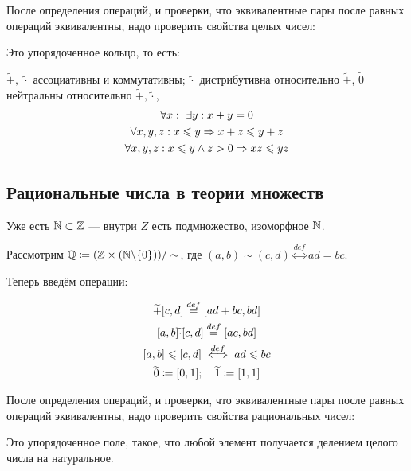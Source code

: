 \documentclass[a4paper]{report}
\begin{document}
    После определения операций, и проверки, что эквивалентные пары после равных операций эквивалентны, надо проверить свойства целых чисел:


    Это упорядоченное кольцо, то есть:

    $\tilde{+}, ~\tilde{\cdot}$ ассоциативны и коммутативны; $\tilde{\cdot}$ дистрибутивна относительно $\tilde{+}$, $\tilde{0}$ нейтральны относительно $\tilde{+}, \tilde{\cdot}$,
    \begin{gather*}
        \forall x:~ \exists y : x + y = 0\\
        \forall x, y, z : x \leqslant y \Rightarrow x + z \leqslant y + z\\
        \forall x, y, z : x \leqslant y \land z > 0 \Rightarrow xz \leqslant yz\\
    \end{gather*}

    \subsection{Рациональные числа в теории множеств}

    Уже есть $\mathbb{N} \subset \mathbb{Z}$ --- внутри $Z$ есть подмножество, изоморфное $\mathbb{N}$.

    Рассмотрим $\mathbb{Q} \coloneqq (\mathbb{Z} \times (\mathbb{N} \backslash \{0\}))/\sim$, где $(a, b) \sim (c, d) \overset{def}{\iff} ad = bc$.

    Теперь введём операции:

    \begin{gather*}
    [a, b]
        \tilde{+} [c, d] \bydef [ad + bc, bd]\\
        [a, b] \tilde{\cdot} [c, d] \bydef [ac, bd]\\
        [a, b] \le [c, d] \overset{def}{\iff} ad \le bc\\
        \tilde{0} \coloneqq [0, 1]; \quad \tilde{1} \coloneqq [1, 1]\\
    \end{gather*}

    После определения операций, и проверки, что эквивалентные пары после равных операций эквивалентны, надо проверить свойства рациональных чисел:

    Это упорядоченное поле, такое, что любой элемент получается делением целого числа на натуральное. %

\end{document}
